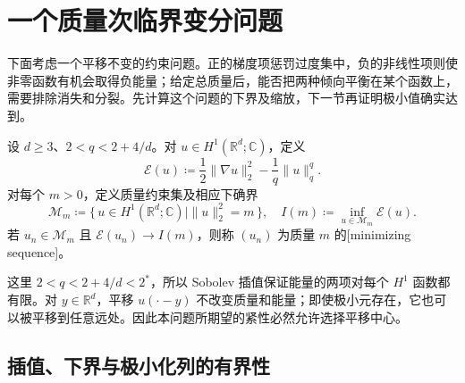 \section{一个质量次临界变分问题}

\label{b2:sec:app-F-4}

下面考虑一个平移不变的约束问题。正的梯度项惩罚过度集中，负的非线性项则使非零函数有机会取得负能量；给定总质量后，能否把两种倾向平衡在某个函数上，需要排除消失和分裂。先计算这个问题的下界及缩放，下一节再证明极小值确实达到。

\begin{definition}[质量约束能量]
\label{b2:def:F-mass-energy}
设 \(d\ge3\)、\(2<q<2+4/d\)。对 \(u\in H^1(\mathbb R^d;\mathbb C)\)，定义
\[
 \mathcal E(u)\coloneqq
       \frac12\|\nabla u\|_2^2-\frac1q\|u\|_q^q.
\]
对每个 \(m>0\)，定义质量约束集及相应下确界
\[
 \mathcal M_m\coloneqq
  \{\,u\in H^1(\mathbb R^d;\mathbb C)\mid\|u\|_2^2=m\,\},
 \quad I(m)\coloneqq\inf_{u\in\mathcal M_m}\mathcal E(u).
\]
若 \(u_n\in\mathcal M_m\) 且 \(\mathcal E(u_n)\to I(m)\)，则称 \((u_n)\) 为质量 \(m\) 的[minimizing sequence]。
\end{definition}

这里 \(2<q<2+4/d<2^*\)，所以 Sobolev 插值保证能量的两项对每个 \(H^1\) 函数都有限。对 \(y\in\mathbb R^d\)，平移 \(u(\cdot-y)\) 不改变质量和能量；即使极小元存在，它也可以被平移到任意远处。因此本问题所期望的紧性必然允许选择平移中心。

\subsection{插值、下界与极小化列的有界性}

\label{b2:subsec:F-coercivity}

